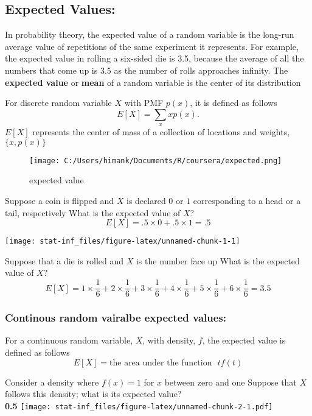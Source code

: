 \documentclass[]{article}
\begin{document}
\hypertarget{expected-values}{%
\subsection{Expected Values:}\label{expected-values}}

In probability theory, the expected value of a random variable is the
long-run average value of repetitions of the same experiment it
represents. For example, the expected value in rolling a six-sided die
is 3.5, because the average of all the numbers that come up is 3.5 as
the number of rolls approaches infinity. The \textbf{expected value} or
\textbf{mean} of a random variable is the center of its distribution

For discrete random variable \(X\) with PMF \(p(x)\), it is defined as
follows \[
E[X] = \sum_x xp(x).
\] \(E[X]\) represents the center of mass of a collection of locations
and weights, \(\{x, p(x)\}\)

\begin{figure}
\centering
\texttt{[image: C:/Users/himank/Documents/R/coursera/expected.png]}
\caption{expected value}
\end{figure}

Suppose a coin is flipped and \(X\) is declared \(0\) or \(1\)
corresponding to a head or a tail, respectively What is the expected
value of \(X\)? \[
E[X] = .5 \times 0 + .5 \times 1 = .5
\]

\begin{center}\texttt{[image: stat-inf\_files/figure-latex/unnamed-chunk-1-1]} \end{center}

Suppose that a die is rolled and \(X\) is the number face up What is the
expected value of \(X\)? \[
E[X] = 1 \times \frac{1}{6} + 2 \times \frac{1}{6} +
3 \times \frac{1}{6} + 4 \times \frac{1}{6} +
5 \times \frac{1}{6} + 6 \times \frac{1}{6} = 3.5
\]

\hypertarget{continous-random-vairalbe-expected-values}{%
\subsubsection{Continous random vairalbe expected
values:}\label{continous-random-vairalbe-expected-values}}

For a continuous random variable, \(X\), with density, \(f\), the
expected value is defined as follows \[
E[X] = \mbox{the area under the function}~~~ t f(t)
\]

Consider a density where \(f(x) = 1\) for \(x\) between zero and one
Suppose that \(X\) follows this density; what is its expected value?\\
\textbf{0.5}
\texttt{[image: stat-inf\_files/figure-latex/unnamed-chunk-2-1.pdf]}
\end{document}
